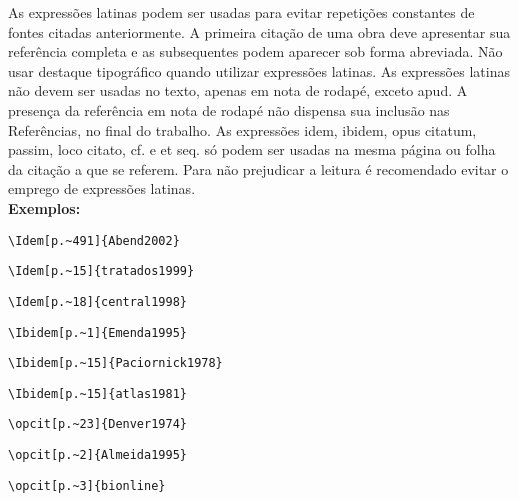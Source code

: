 \begin{alineas}
As expressões latinas podem ser usadas para evitar repetições constantes de fontes citadas anteriormente. A primeira citação de uma obra deve apresentar sua referência completa e as subsequentes podem aparecer sob forma abreviada. Não usar destaque tipográfico quando utilizar expressões latinas. As expressões latinas não devem ser usadas no texto, apenas em nota de rodapé, exceto apud. A presença da referência em nota de rodapé não dispensa sua inclusão nas Referências, no final do trabalho. As expressões idem, ibidem, opus citatum, passim, loco citato, cf. e et seq. só podem ser usadas na mesma página ou folha da citação a que se referem. Para não prejudicar a leitura é recomendado evitar o emprego de expressões latinas.\\

\textbf{Exemplos:}

\begin{verbatim}
\Idem[p.~491]{Abend2002}
\end{verbatim}

\begin{verbatim}
\Idem[p.~15]{tratados1999}
\end{verbatim}

\begin{verbatim}
\Idem[p.~18]{central1998}
\end{verbatim}

\begin{verbatim}
\Ibidem[p.~1]{Emenda1995}
\end{verbatim}

\begin{verbatim}
\Ibidem[p.~15]{Paciornick1978}
\end{verbatim}

\begin{verbatim}
\Ibidem[p.~15]{atlas1981}
\end{verbatim}

\begin{verbatim}
\opcit[p.~23]{Denver1974}
\end{verbatim}

\begin{verbatim}
\opcit[p.~2]{Almeida1995}
\end{verbatim}

\begin{verbatim}
\opcit[p.~3]{bionline}
\end{verbatim}


\end{alineas}
